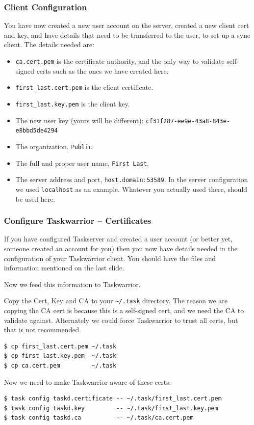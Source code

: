 \documentclass[t,handout]{beamer}
\begin{document}
\begin{frame}[fragile]\frametitle{Client Configuration}
    You have now created a new user account on the server, created a new client cert and key, and have details that need to be transferred to the user, to set up a sync client.  The details needed are:

    \begin{itemize}
        \item \verb+ca.cert.pem+ is the certificate authority, and the only way to validate self-signed certs such as the ones we have created here.
        \item \verb+first_last.cert.pem+ is the client certificate.
        \item \verb+first_last.key.pem+ is the client key.
        \item The new user key (yours will be different): \verb+cf31f287-ee9e-43a8-843e-e8bbd5de4294+
        \item The organization, \verb+Public+.
        \item The full and proper user name, \verb+First Last+.
        \item The server address and port, \verb+host.domain:53589+. In the server configuration we used \verb+localhost+ as an example. Whatever you actually used there, should be used here.
  \end{itemize}
\end{frame}

\begin{frame}[fragile]\frametitle{Configure Taskwarrior -- Certificates}
    If you have configured Taskserver and created a user account (or better yet, someone created an account for you) then you now have details needed in the configuration of your Taskwarrior client. You should have the files and information mentioned on the last slide.

    Now we feed this information to Taskwarrior.

    Copy the Cert, Key and CA to your \verb+~/.task+ directory.  The reason we are copying the CA cert is because this is a self-signed cert, and we need the CA to validate against.  Alternately we could force Taskwarrior to trust all certs, but that is not recommended.

    \begin{lstlisting}
$ cp first_last.cert.pem ~/.task
$ cp first_last.key.pem  ~/.task
$ cp ca.cert.pem         ~/.task\end{lstlisting}

    Now we need to make Taskwarrior aware of these certs:

    \begin{lstlisting}
$ task config taskd.certificate -- ~/.task/first_last.cert.pem
$ task config taskd.key         -- ~/.task/first_last.key.pem
$ task config taskd.ca          -- ~/.task/ca.cert.pem\end{lstlisting}
\end{frame}
\end{document}
